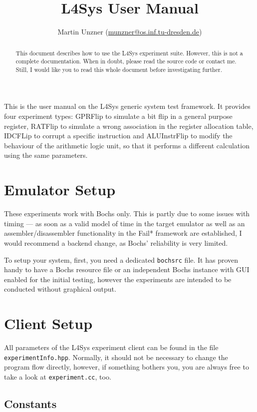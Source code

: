 \documentclass[a4paper,10pt]{article}
\title{L4Sys User Manual}
\author{Martin Unzner (\href{mailto:munzner@os.inf.tu-dresden.de}{munzner@os.inf.tu-dresden.de})}
\begin{document}
\maketitle

\begin{abstract}
This document describes how to use the L4Sys experiment suite.
However, this is not a complete documentation. When in doubt,
please read the source code or contact me. Still, I would like
you to read this whole document before investigating further.
\end{abstract}

This is the user manual on the L4Sys generic system test framework.
It provides four experiment types: GPRFlip to simulate a bit flip
in a general purpose register, RATFlip to simulate a wrong association
in the register allocation table, IDCFLip to corrupt a specific instruction
and ALUInstrFlip to modify the behaviour of the arithmetic logic unit,
so that it performs a different calculation using the same parameters.

\section{Emulator Setup}

These experiments work with Bochs only. This is partly due to some
issues with timing --- as soon as a valid model of
time in the target emulator as well as an assembler/disassembler
functionality in the Fail* framework are established, I would recommend a
backend change, as Bochs' reliability is very limited.

To setup your system, first, you need a dedicated \texttt{bochsrc} file.
It has proven handy to have
a Bochs resource file or an independent Bochs instance with GUI enabled
for the initial testing, however the experiments are intended to be
conducted without graphical output.

\section{Client Setup}

All parameters of the L4Sys experiment client can be found
in the file \texttt{experimentInfo.hpp}. Normally, it should
not be necessary to change the program flow directly, however,
if something bothers you, you are always free to take a look
at \texttt{experiment.cc}, too.

\subsection{Constants}
\end{document}
